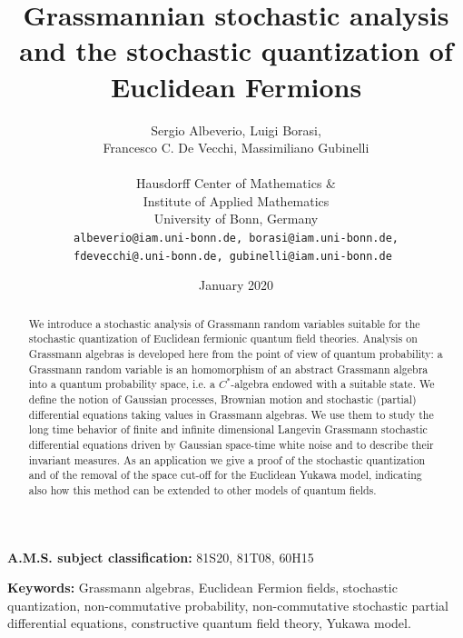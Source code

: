 \documentclass{article}
\newcommand{\tmsep}{, }
\newcommand{\tmkeywords}{\textbf{Keywords:} }
\newcommand{\tmmsc}{\textbf{A.M.S. subject classification:} }
\newcommand{\tmaffiliation}[1]{\\ #1}
\begin{document}
\title{
  Grassmannian stochastic analysis
  and the stochastic quantization
  of Euclidean Fermions
}



\author{Sergio Albeverio, Luigi Borasi,\\ Francesco C. De Vecchi, Massimiliano Gubinelli\\[.5em]
  \tmaffiliation{Hausdorff Center of Mathematics \&\\
  Institute of Applied Mathematics\\
  University of Bonn, Germany}\\[.2em]
  \tt{\small albeverio@iam.uni-bonn.de, borasi@iam.uni-bonn.de,}\\
  \tt{\small fdevecchi@.uni-bonn.de, gubinelli@iam.uni-bonn.de}
}

\date{January 2020}


\maketitle

\begin{abstract}
  We introduce a stochastic analysis of Grassmann random variables suitable
  for the stochastic quantization of Euclidean fermionic quantum field
  theories. Analysis on Grassmann algebras is developed here from the point of
  view of quantum probability: a Grassmann random variable is an homomorphism
  of an abstract Grassmann algebra into a quantum probability space, i.e. a
  $C^{\ast}$-algebra endowed with a suitable state. We define the notion of
  Gaussian processes, Brownian motion and stochastic (partial) differential
  equations taking values in Grassmann algebras. We use them to study the long
  time behavior of finite and infinite dimensional Langevin Grassmann
  stochastic differential equations driven by Gaussian space-time white noise
  and to describe their invariant measures. As an application we give a proof
  of the stochastic quantization and of the removal of the space cut-off for
  the Euclidean Yukawa model, indicating also how this method can be extended
  to other models of quantum fields.
\end{abstract}

\tmmsc{81S20}{\tmsep}{81T08}{\tmsep}{60H15}

\tmkeywords{Grassmann algebras, Euclidean Fermion fields, stochastic
quantization, non-commutative probability, non-commutative stochastic partial
differential equations, constructive quantum field theory, Yukawa model.}
\end{document}
